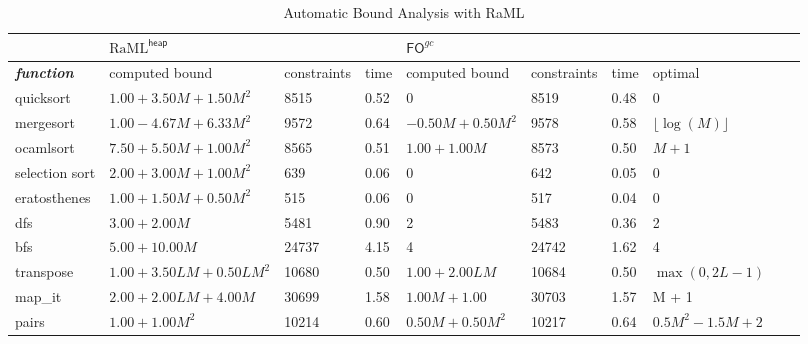 \documentclass{easychair}
\newcommand{\ms}[1]{\ensuremath{\mathsf{#1}}}
\newcounter{rule}
\newcommand{\fogc}{\ms{FO}^{gc}}
\newcommand{\foheap}{\text{RaML}^{\ms{heap}}}
\theoremstyle{definition}
\begin{document}
\begin{table}[]
	\begin{adjustbox}{width=1\textwidth, center=\textwidth}
  \begin{tabular}{@{}llllllllll@{}}
		\toprule
		 & \multicolumn{3}{l}{$\foheap$} & \multicolumn{3}{l}{$\fogc$} &  \\ \midrule
		 \textit{\textbf{function}} & computed bound & constraints & time & computed bound &  constraints & time & optimal \\
		 quicksort & $1.00 + 3.50M + 1.50M^2$ & 8515 & 0.52 & 0 & 8519 & 0.48 & 0 \\
		 mergesort & $1.00 - 4.67M + 6.33M^2$ & 9572 & 0.64 & $-0.50M + 0.50M^2$ & 9578 & 0.58 & $\lfloor \log(M) \rfloor$ \\
		 ocamlsort & $7.50 + 5.50M + 1.00M^2$ & 8565 & 0.51 & $1.00 + 1.00M$ & 8573 & 0.50 & $M+1$ \\
		 selection sort & $2.00 + 3.00M + 1.00M^2$ & 639 & 0.06 & 0 & 642 & 0.05 & 0 \\
		 eratosthenes & $1.00 + 1.50M + 0.50M^2$ & 515 & 0.06 & 0 & 517 & 0.04 & 0 \\
		 dfs & $3.00 + 2.00M$ & 5481 & 0.90 & 2 & 5483 & 0.36 & 2 \\
		 bfs & $5.00 + 10.00M$ & 24737 & 4.15 & 4 & 24742 & 1.62 & 4 \\
		 transpose & $1.00 + 3.50LM + 0.50LM^2$ & 10680 & 0.50 & $1.00 + 2.00LM$ & 10684 & 0.50 & $\max{(0,2L-1)}$ \\
		 map\_it & $2.00 + 2.00LM + 4.00M$ & 30699 & 1.58 & $1.00M + 1.00$ & 30703 & 1.57 & M + 1 \\
		 pairs & $1.00 + 1.00M^2$ & 10214 & 0.60 & $0.50M + 0.50M^2$ & 10217 & 0.64 & $0.5M^2-1.5M+2$ \\ \midrule
	\end{tabular}
	\end{adjustbox}
	\caption{Automatic Bound Analysis with RaML}
\label{table:bounds}
\end{table}
\end{document}
